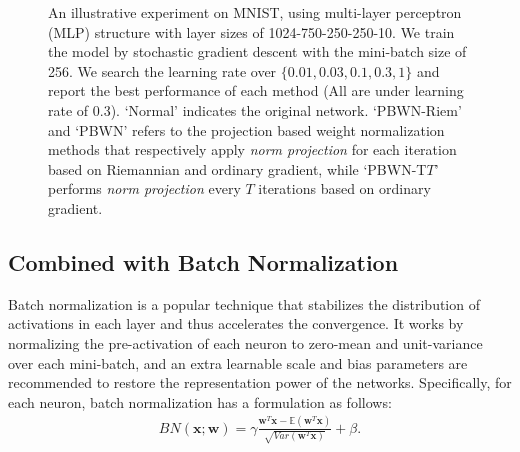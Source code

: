 \documentclass[twocolumn]{article}
\begin{document}


\begin{figure*}[t]
\centering
\hspace{-0.02\linewidth}
  \caption{\small An illustrative experiment on MNIST, using multi-layer perceptron (MLP) structure with layer sizes of 1024-750-250-250-10. We train the model by stochastic gradient descent with the mini-batch size of 256. We search the learning rate over $\{0.01,0.03,0.1,0.3,1\}$ and report the best performance of each method (All are under learning rate of 0.3). `Normal' indicates the original network. `PBWN-Riem' and `PBWN' refers to the projection based weight normalization methods that respectively apply \emph{norm projection} for each iteration based on Riemannian and ordinary gradient, while `PBWN-T$T$' performs \emph{norm projection} every $T$ iterations based on ordinary gradient.}
  \label{fig:exp_T}
\end{figure*}


\subsection{Combined with Batch Normalization}
Batch normalization is a popular technique that stabilizes the distribution of activations in each layer and thus accelerates the convergence. It works by normalizing the pre-activation of each neuron to zero-mean and unit-variance over each mini-batch, and an extra learnable scale and bias parameters are recommended to restore the representation power of the networks. Specifically, for each neuron, batch normalization has a formulation as follows:
\begin{eqnarray}
 \label{eqn:BN}
BN(\mathbf{x}; \mathbf{w})= \gamma \frac{\mathbf{w}^T \mathbf{x}- \mathbb{E}(\mathbf{w}^T \mathbf{x})}{\sqrt{Var (\mathbf{w}^T \mathbf{x})}}+\beta.
\end{eqnarray}
\end{document}
